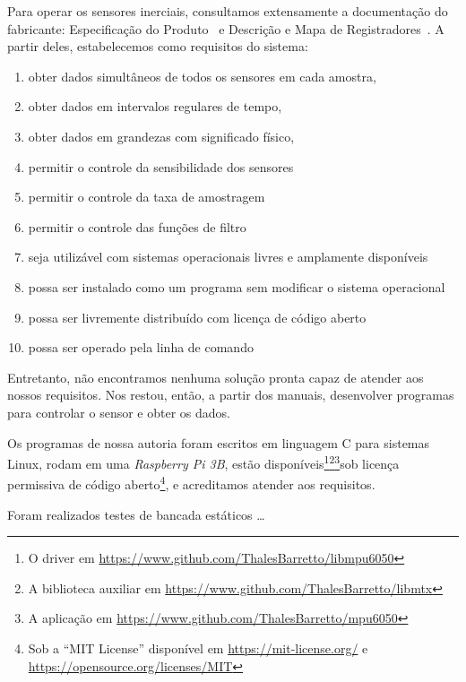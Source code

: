 Para operar os sensores inerciais, consultamos extensamente a documentação do fabricante: Especificação do Produto~\cite{mpu6050ps} e Descrição e Mapa de Registradores~\cite{mpu6050rm}.
A partir deles, estabelecemos como requisitos do sistema:
\begin{enumerate}
        \item obter dados simultâneos de todos os sensores em cada amostra,
        \item obter dados em intervalos regulares de tempo,
        \item obter dados em grandezas com significado físico,
        \item permitir o controle da sensibilidade dos sensores
        \item permitir o controle da taxa de amostragem
        \item permitir o controle das funções de filtro
        \item seja utilizável com sistemas operacionais livres e amplamente disponíveis
        \item possa ser instalado como um programa sem modificar o sistema operacional
        \item possa ser livremente distribuído com licença de código aberto
        \item possa ser operado pela linha de comando
\end{enumerate}

Entretanto, não encontramos nenhuma solução pronta capaz de atender aos nossos requisitos. Nos restou, então, a partir dos manuais, desenvolver programas para controlar o sensor e obter os dados.

Os programas de nossa autoria foram escritos em linguagem C para sistemas Linux, rodam em uma \emph{Raspberry Pi 3B}, estão disponíveis\footnote{O driver em \href{https://www.github.com/ThalesBarretto/libmpu6050}{https://www.github.com/ThalesBarretto/libmpu6050}}\footnote{A biblioteca auxiliar em \href{https://www.github.com/ThalesBarretto/libmtx}{https://www.github.com/ThalesBarretto/libmtx}}\footnote{A aplicação em \href{https://www.github.com/ThalesBarretto/mpu6050}{https://www.github.com/ThalesBarretto/mpu6050}}sob licença permissiva de código aberto\footnote{Sob a ``MIT License'' disponível em \href{https://mit-license.org/}{https://mit-license.org/} e \href{https://opensource.org/licenses/MIT}{https://opensource.org/licenses/MIT}}, e acreditamos atender aos requisitos.

Foram realizados testes de bancada estáticos \ldots

